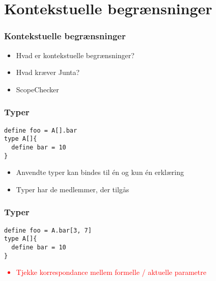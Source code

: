 \section{Kontekstuelle begrænsninger}

\begin{frame}
\frametitle{Kontekstuelle begrænsninger}
\begin{center}
\begin{itemize}
\item Hvad er kontekstuelle begrænsninger?
\item Hvad kræver Junta?
\item ScopeChecker
\end{itemize}
\end{center}
\end{frame}


\begin{frame}[fragile]
\frametitle{Typer}
\begin{lstlisting}
define foo = A[].bar
type A[]{
  define bar = 10
}
\end{lstlisting}
\begin{center}
\begin{itemize}                                  
\item Anvendte typer kan bindes til én og kun én erklæring
\item Typer har de medlemmer, der tilgås
\end{itemize}
\end{center}
\end{frame}

\begin{frame}[fragile]

\end{frame}

\begin{frame}[fragile]
\frametitle{Typer}
\begin{lstlisting}
define foo = A.bar[3, 7]
type A[]{
  define bar = 10
}
\end{lstlisting}
\begin{center}
\textcolor{red}{
\begin{itemize}                                  
\item Tjekke korrespondance mellem formelle / aktuelle parametre
\end{itemize}
}
\end{center}
\end{frame}

